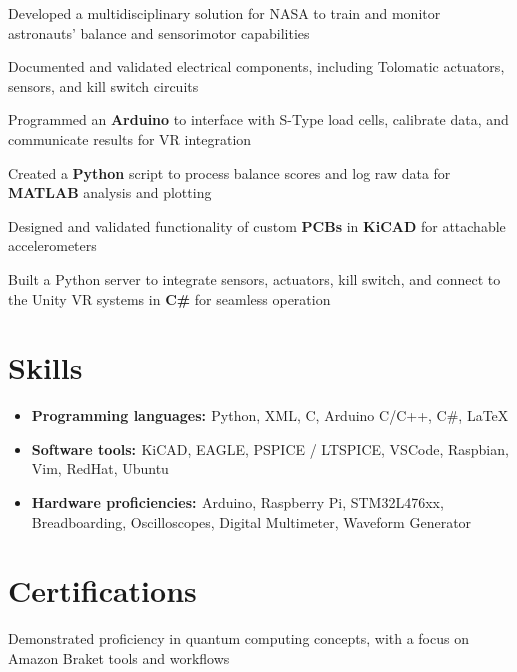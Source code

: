 \documentclass[a4paper]{comcv}
\begin{document}
\vspace{5 mm}
    \begin{tightlist}
        \item Developed a multidisciplinary solution for NASA to train and monitor astronauts' balance and sensorimotor capabilities
        \item Documented and validated electrical components, including Tolomatic actuators, sensors, and kill switch circuits
        \item Programmed an {\bf{Arduino}} to interface with S-Type load cells, calibrate data, and communicate results for VR integration
        \item Created a {\bf{Python}} script to process balance scores and log raw data for {\bf{MATLAB}} analysis and plotting
        \item Designed and validated functionality of custom {\bf{PCBs}} in {\bf{KiCAD}} for attachable accelerometers
        \item Built a Python server to integrate sensors, actuators, kill switch, and connect to the Unity VR systems in {\bf{C\#}} for seamless operation

\end{tightlist}
\smallskip


\section{Skills}
\smallskip
\begin{itemize}
    \item {\bf{Programming languages: }}  {Python, XML, C, Arduino C/C++, C\#, LaTeX} 
    \item {\bf{Software tools: }} {KiCAD, EAGLE, PSPICE / LTSPICE, VSCode, Raspbian, Vim, RedHat, Ubuntu}
    \item {\bf{Hardware proficiencies: }}  {Arduino, Raspberry Pi, STM32L476xx, Breadboarding, Oscilloscopes, Digital Multimeter, Waveform Generator} 
\end{itemize}
\smallskip

\section{Certifications}
\smallskip

\smallskip
\begin{tightlist}
    \item Demonstrated proficiency in quantum computing concepts, with a focus on Amazon Braket tools and workflows
\end{tightlist}
\end{document}

